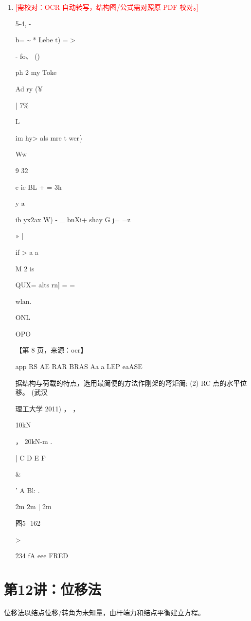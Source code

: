 \documentclass[UTF8,12pt,a4paper,openany]{ctexbook}
\newcommand{\TODO}[1]{\textcolor{red}{[需校对：#1]}}
\begin{document}
\begin{enumerate}[label=\textbf{\arabic*.},leftmargin=2em]
\item \TODO{OCR 自动转写，结构图/公式需对照原 PDF 校对。}\par 5-4,  -\par b= \textasciitilde{}    * Lebe    t) =   >\par - fo、 ()\par ph             2 my       Toke\par Ad               ry          (¥\par |         7\%\par L\par im                  hy> als mre t wer\}\par Ww\par 9            32\par *e        ie BL  + = 3h\par y                        a\par ib       yx2ax W) - \_           bnXi+ shay G  j=  =z\par » |\par if  >               a     a\par M                2          is\par QUX= alts rn] =  =\par wlan.\par ONL\par OPO\par \par 【第 8 页，来源：ocr】\par app RS AE RAR BRAS Aa a LEP eaASE\par 据结构与荷载的特点，选用最简便的方法作刚架的弯矩简; (2) RC 点的水平位移。 (武汉\par 理工大学 2011)            ，                ，\par 10kN\par ，               20kN-m            .\par |                C     D      E        F\par \&\par ’               A             Bl:                   .\par 2m   2m   |   2m\par 图5- 162\par >\par 234                                                          fA eee FRED
\end{enumerate}
\chapter{第12讲：位移法}
\begin{tcolorbox}[title=解析总览]
位移法以结点位移/转角为未知量，由杆端力和结点平衡建立方程。
\end{tcolorbox}
\end{document}
